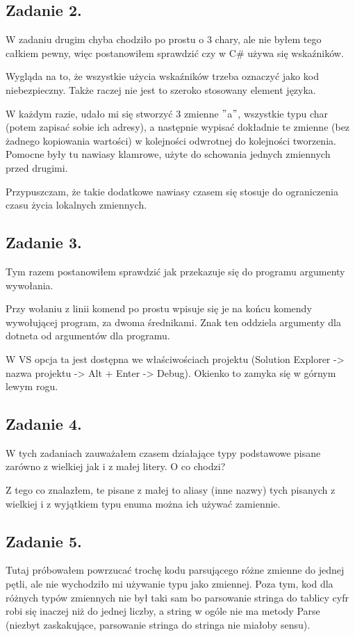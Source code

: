 \documentclass[10pt]{article}
\begin{document}
\subsection{Zadanie 2.}
W zadaniu drugim chyba chodziło po prostu o 3 chary, ale nie byłem tego całkiem pewny, więc postanowiłem sprawdzić czy w C\# używa się wskaźników.

Wygląda na to, że wszystkie użycia wskaźników trzeba oznaczyć jako kod niebezpieczny. Także raczej nie jest to szeroko stosowany element języka.

W każdym razie, udało mi się stworzyć 3 zmienne $"$a$"$, wszystkie typu char (potem zapisać sobie ich adresy), a następnie wypisać dokładnie te zmienne (bez żadnego kopiowania wartości) w kolejności odwrotnej do kolejności tworzenia. Pomocne były tu nawiasy klamrowe, użyte do schowania jednych zmiennych przed drugimi.

Przypuszczam, że takie dodatkowe nawiasy czasem się stosuje do ograniczenia czasu życia lokalnych zmiennych.

\subsection{Zadanie 3.}
Tym razem postanowiłem sprawdzić jak przekazuje się do programu argumenty wywołania.

Przy wołaniu z linii komend po prostu wpisuje się je na końcu komendy wywołującej program, za dwoma średnikami. Znak ten oddziela argumenty dla dotneta od argumentów dla programu.

W VS opcja ta jest dostępna we właściwościach projektu (Solution Explorer -> nazwa projektu -> Alt + Enter -> Debug). Okienko to zamyka się w górnym lewym rogu.

\subsection{Zadanie 4.}
W tych zadaniach zauważałem czasem działające typy podstawowe pisane zarówno z wielkiej jak i z małej litery. O co chodzi?

Z tego co znalazłem, te pisane z małej to aliasy (inne nazwy) tych pisanych z wielkiej i z wyjątkiem typu enuma można ich używać zamiennie.

\subsection{Zadanie 5.}
Tutaj próbowałem powrzucać trochę kodu parsującego różne zmienne do jednej pętli, ale nie wychodziło mi używanie typu jako zmiennej. Poza tym, kod dla różnych typów zmiennych nie był taki sam bo parsowanie stringa do tablicy cyfr robi się inaczej niż do jednej liczby, a string w ogóle nie ma metody Parse (niezbyt zaskakujące, parsowanie stringa do stringa nie miałoby sensu).
\end{document}
